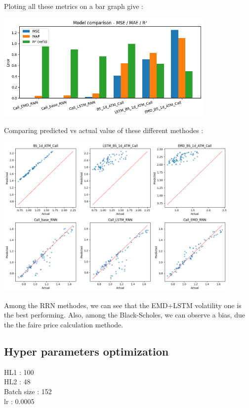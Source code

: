 \documentclass[letterpaper,11pt]{article}
\begin{document}
Ploting all these metrics on a bar graph give :

\begin{center}
\includegraphics[width=0.8\textwidth]{img/model_comp_bar.png}
\end{center}

Comparing predicted vs actual value of these different methodes :

\begin{center}
\includegraphics[width=0.9\textwidth]{img/model_comp_sca.png}
\end{center}

Among the RRN methodes, we can see that the EMD+LSTM volatility one is the best performing.
Also, among the Black-Scholes, we can observe a bias, due the the faire price calculation methode.



\subsection*{Hyper parameters optimization}

HL1 : 100\\
HL2 : 48\\
Batch size : 152\\
lr : 0.0005
\end{document}
